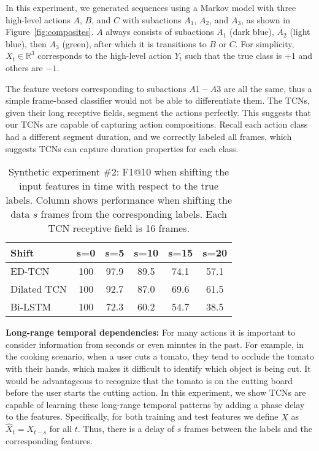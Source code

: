 \documentclass[10pt,twocolumn,letterpaper]{article}
\newcommand{\fakesubsection}[1]{\smallskip\noindent\textbf{#1:}}
\begin{document}
In this experiment, we generated sequences using a Markov model with three high-level actions $A$, $B$, and $C$ with subactions $A_1$, $A_2$, and $A_3$, as shown in Figure~\ref{fig:composites}. $A$ always consists of subactions $A_1$ (dark blue), $A_2$ (light blue), then $A_3$ (green), after which it is transitions to $B$ or $C$.
For simplicity, $X_t \in \mathbb{R}^3$ corresponds to the high-level action $Y_t$ such that the true class is $+1$ and others are $-1$. 





The feature vectors corresponding to subactions $A1-A3$ are all the same, thus a simple frame-based classifier would not be able to differentiate them. The TCNs, given their long receptive fields, segment the actions perfectly. 
This suggests that our TCNs are capable of capturing action compositions. 
Recall each action class had a different segment duration, and we correctly labeled all frames, which suggests TCNs can capture duration properties for each class. 


\begin{table}
	\centering
	\begin{tabular}{|l|c|c|c|c|c|}
		\hline
		Shift & s=0 & s=5 & s=10 & s=15 & s=20\\
		\hline		
ED-TCN  & 100 & 97.9 & 89.5 & 74.1 & 57.1 \\
Dilated TCN & 100 & 92.7 & 87.0 & 69.6 & 61.5\\
Bi-LSTM & 100 & 72.3 &  60.2 & 54.7 & 38.5\\ 
		\hline
	\end{tabular}
	\label{tab:shift_results}	
	\caption{Synthetic experiment \#2: F1@10 when shifting the input features in time with respect to the true labels. 
Column shows performance when shifting the data $s$ frames from the corresponding labels. Each TCN receptive field is 16 frames.}
\end{table}


\fakesubsection{Long-range temporal dependencies}
For many actions it is important to consider information from seconds or even minutes in the past.
For example, in the cooking scenario, when a user cuts a tomato, they tend to occlude the tomato with their hands, which makes it difficult to identify which object is being cut. It would be advantageous to recognize that the tomato is on the cutting board before the user starts the cutting action. 
In this experiment, we show TCNs are capable of learning these long-range temporal patterns by adding a phase delay to the features. Specifically, for both training and test features we define $\hat{X}$ as $\hat{X}_t=X_{t-s}$ for all $t$. Thus, there is a delay of $s$ frames between the labels and the corresponding features. 
\end{document}
